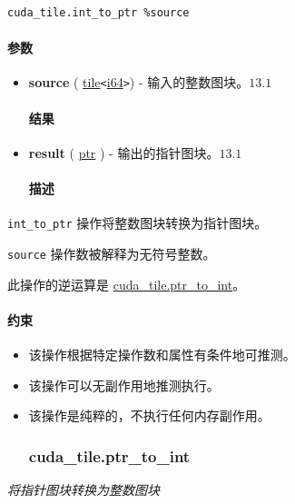 \documentclass{article}
\begin{document}
\begin{lstlisting}
cuda_tile.int_to_ptr %source
\end{lstlisting}

\paragraph{参数}

\begin{itemize}
\item \textbf{source} ( \href{https://docs.nvidia.com/cuda/tile-ir/latest/sections/types.html#type-tile}{tile}\texttt{<}\href{https://docs.nvidia.com/cuda/tile-ir/latest/sections/types.html#subsection-element-types}{i64}\texttt{>}) - 输入的整数图块。$\boxed{13.1}$


\paragraph{结果}

\item \textbf{result} ( \href{https://docs.nvidia.com/cuda/tile-ir/latest/sections/types.html#type-ptr}{ptr} ) - 输出的指针图块。$\boxed{13.1}$


\paragraph{描述}

\end{itemize}
\texttt{int\_to\_ptr} 操作将整数图块转换为指针图块。


\texttt{source} 操作数被解释为无符号整数。


此操作的逆运算是 \href{https://docs.nvidia.com/cuda/tile-ir/latest/sections/operations.html#op-cuda-tile-ptr-to-int}{cuda\_tile.ptr\_to\_int}。



\paragraph{约束}

\begin{itemize}
\item 该操作根据特定操作数和属性有条件地可推测。
\item 该操作可以无副作用地推测执行。
\item 该操作是纯粹的，不执行任何内存副作用。


\subsubsection{cuda\_tile.ptr\_to\_int}

\end{itemize}
\textit{将指针图块转换为整数图块}
\end{document}
